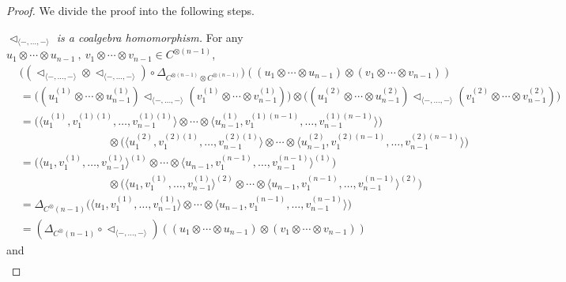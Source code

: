 \documentclass[10pt,a4paper]{amsart}
\begin{document}
\begin{proof} We divide the proof into the following steps.

   {\em $\triangleleft_{\langle -, \ldots, - \rangle } $ is a coalgebra homomorphism.} For any $u_1 \otimes \cdots \otimes u_{n-1} ~\! , ~ \! v_1 \otimes \cdots \otimes v_{n-1} \in C^{\otimes (n-1)}$,
     \begin{align*}
       & \big( (\triangleleft_{\langle -, \ldots , - \rangle } \otimes \triangleleft_{\langle -, \ldots , - \rangle }) \circ \Delta_{C^{\otimes (n-1)} \otimes C^{\otimes (n-1)}} \big) ((u_1 \otimes \cdots \otimes u_{n-1}) \otimes (v_1 \otimes \cdots \otimes v_{n-1})) \\
        &= \big( (u_1^{(1)} \otimes \cdots \otimes u_{n-1}^{(1)}) \triangleleft_{\langle -, \ldots , - \rangle } (v_1^{(1)} \otimes \cdots \otimes v_{n-1}^{(1)}) \big) \otimes \big( (u_1^{(2)} \otimes \cdots \otimes u_{n-1}^{(2)}) \triangleleft_{\langle -, \ldots , - \rangle } (v_1^{(2)} \otimes \cdots \otimes v_{n-1}^{(2)}) \big) \\
        &= \big(  \langle u_1^{(1)} , v_1^{(1)(1)} , \ldots, v_{n-1}^{(1)(1)} \rangle \otimes \cdots \otimes \langle u_{n-1}^{(1)} , v_1^{(1)(n-1)} , \ldots, v_{n-1}^{(1)(n-1)} \rangle  \big) \\
        & \qquad \qquad \qquad \qquad \otimes \big(  \langle u_1^{(2)} , v_1^{(2)(1)} , \ldots, v_{n-1}^{(2)(1)} \rangle \otimes \cdots \otimes  \langle u_{n-1}^{(2)} , v_1^{(2)(n-1)} , \ldots, v_{n-1}^{(2)(n-1)} \rangle  \big) \\
        &= \big(   \langle u_1, v_1^{(1)}, \ldots, v_{n-1}^{(1)} \rangle^{(1)} \otimes \cdots \otimes \langle  u_{n-1}, v_1^{(n-1)}, \ldots, v_{n-1}^{(n-1)}  \rangle^{(1)} \big) \\
        & \qquad \qquad \qquad \qquad \otimes \big(   \langle u_1, v_1^{(1)}, \ldots, v_{n-1}^{(1)} \rangle^{(2)} \otimes \cdots \otimes \langle  u_{n-1}, v_1^{(n-1)}, \ldots, v_{n-1}^{(n-1)}  \rangle^{(2)}    \big) \\
        &= \Delta_{C^\otimes (n-1)} \big(   \langle u_1, v_1^{(1)}, \ldots, v_{n-1}^{(1)} \rangle \otimes \cdots \otimes  \langle u_{n-1}, v_1^{(n-1)}, \ldots, v_{n-1}^{(n-1)} \rangle \big) \\
        &= (\Delta_{C^\otimes (n-1)} \circ \triangleleft_{\langle -, \ldots , - \rangle }) ((u_1 \otimes \cdots \otimes u_{n-1}) \otimes (v_1 \otimes \cdots \otimes v_{n-1}))
     \end{align*}
     and
     \begin{align*}

\end{align*}
\end{proof}
\end{document}
